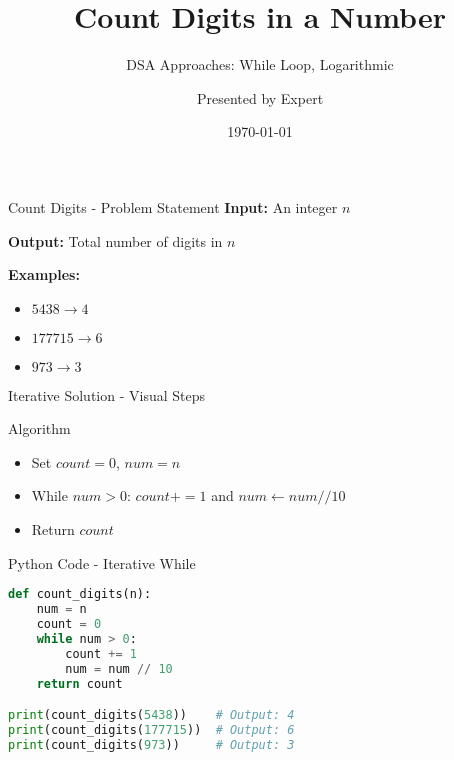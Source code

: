 \documentclass[aspectratio=169]{beamer}
\title{\textbf{Count Digits in a Number}}
\subtitle{DSA Approaches: While Loop, Logarithmic}
\author{Presented by Expert}
\date{\today}
\begin{document}
\begin{frame}
\titlepage
\end{frame}

\begin{frame}{Count Digits - Problem Statement}
\textbf{Input:} An integer $n$

\textbf{Output:} Total number of digits in $n$

\textbf{Examples:}
\begin{itemize}
  \item $5438 \rightarrow 4$
  \item $177715 \rightarrow 6$
  \item $973 \rightarrow 3$
\end{itemize}
\end{frame}

\begin{frame}{Iterative Solution - Visual Steps}
\begin{block}{Algorithm}
\begin{itemize}
  \item Set $count=0$, $num=n$
  \item While $num>0$: $count+=1$ and $num \gets num // 10$
  \item Return $count$
\end{itemize}
\end{block}
\begin{center}
\end{center}
\end{frame}

\begin{frame}[fragile]{Python Code - Iterative While}
\begin{lstlisting}[language=Python]
def count_digits(n):
    num = n
    count = 0
    while num > 0:
        count += 1
        num = num // 10
    return count

print(count_digits(5438))    # Output: 4
print(count_digits(177715))  # Output: 6
print(count_digits(973))     # Output: 3
\end{lstlisting}
\end{frame}
\end{document}
